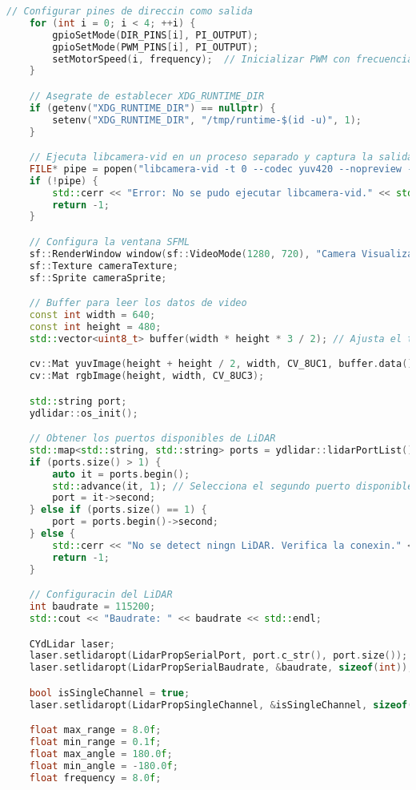 \begin{lstlisting}[language={C++}, caption={Cuarto ajuste de c\'odigo}, label={CuartoAjuste}]
    // Configurar pines de direccin como salida
    for (int i = 0; i < 4; ++i) {
        gpioSetMode(DIR_PINS[i], PI_OUTPUT);
        gpioSetMode(PWM_PINS[i], PI_OUTPUT);
        setMotorSpeed(i, frequency);  // Inicializar PWM con frecuencia inicial
    }

    // Asegrate de establecer XDG_RUNTIME_DIR
    if (getenv("XDG_RUNTIME_DIR") == nullptr) {
        setenv("XDG_RUNTIME_DIR", "/tmp/runtime-$(id -u)", 1);
    }

    // Ejecuta libcamera-vid en un proceso separado y captura la salida en YUV, sin previsualizacn
    FILE* pipe = popen("libcamera-vid -t 0 --codec yuv420 --nopreview -o -", "r");
    if (!pipe) {
        std::cerr << "Error: No se pudo ejecutar libcamera-vid." << std::endl;
        return -1;
    }

    // Configura la ventana SFML
    sf::RenderWindow window(sf::VideoMode(1280, 720), "Camera Visualization with LiDAR");
    sf::Texture cameraTexture;
    sf::Sprite cameraSprite;

    // Buffer para leer los datos de video
    const int width = 640;
    const int height = 480;
    std::vector<uint8_t> buffer(width * height * 3 / 2); // Ajusta el tamao del buffer para YUV420

    cv::Mat yuvImage(height + height / 2, width, CV_8UC1, buffer.data());
    cv::Mat rgbImage(height, width, CV_8UC3);

    std::string port;
    ydlidar::os_init();

    // Obtener los puertos disponibles de LiDAR
    std::map<std::string, std::string> ports = ydlidar::lidarPortList();
    if (ports.size() > 1) {
        auto it = ports.begin();
        std::advance(it, 1); // Selecciona el segundo puerto disponible
        port = it->second;
    } else if (ports.size() == 1) {
        port = ports.begin()->second;
    } else {
        std::cerr << "No se detect ningn LiDAR. Verifica la conexin." << std::endl;
        return -1;
    }

    // Configuracin del LiDAR
    int baudrate = 115200;
    std::cout << "Baudrate: " << baudrate << std::endl;

    CYdLidar laser;
    laser.setlidaropt(LidarPropSerialPort, port.c_str(), port.size());
    laser.setlidaropt(LidarPropSerialBaudrate, &baudrate, sizeof(int));

    bool isSingleChannel = true;
    laser.setlidaropt(LidarPropSingleChannel, &isSingleChannel, sizeof(bool));

    float max_range = 8.0f;
    float min_range = 0.1f;
    float max_angle = 180.0f;
    float min_angle = -180.0f;
    float frequency = 8.0f;


\end{lstlisting}
